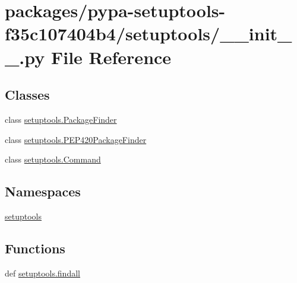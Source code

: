 \hypertarget{packages_2pypa-setuptools-f35c107404b4_2setuptools_2____init_____8py}{}\section{packages/pypa-\/setuptools-\/f35c107404b4/setuptools/\+\_\+\+\_\+init\+\_\+\+\_\+.py File Reference}
\label{packages_2pypa-setuptools-f35c107404b4_2setuptools_2____init_____8py}
\subsection*{Classes}
\begin{DoxyCompactItemize}
\item 
class \hyperlink{classsetuptools_1_1PackageFinder}{setuptools.\+Package\+Finder}
\item 
class \hyperlink{classsetuptools_1_1PEP420PackageFinder}{setuptools.\+P\+E\+P420\+Package\+Finder}
\item 
class \hyperlink{classsetuptools_1_1Command}{setuptools.\+Command}
\end{DoxyCompactItemize}
\subsection*{Namespaces}
\begin{DoxyCompactItemize}
\item 
 \hyperlink{namespacesetuptools}{setuptools}
\end{DoxyCompactItemize}
\subsection*{Functions}
\begin{DoxyCompactItemize}
\item 
def \hyperlink{namespacesetuptools_a252320a52388a86c457dd880ae59e592}{setuptools.\+findall}
\end{DoxyCompactItemize}
